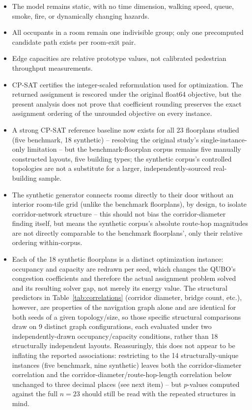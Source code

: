 \documentclass[11pt]{article}
\begin{document}
\begin{itemize}[leftmargin=*]
\item The model remains static, with no time dimension, walking speed, queue, smoke, fire, or dynamically changing hazards.
\item All occupants in a room remain one indivisible group; only one precomputed candidate path exists per room-exit pair.
\item Edge capacities are relative prototype values, not calibrated pedestrian throughput measurements.
\item CP-SAT certifies the integer-scaled reformulation used for optimization. The returned assignment is rescored under the original float64 objective, but the present analysis does not prove that coefficient rounding preserves the exact assignment ordering of the unrounded objective on every instance.
\item A strong CP-SAT reference baseline now exists for all 23 floorplans studied (five benchmark, 18 synthetic) -- resolving the original study's single-instance-only limitation -- but the benchmark-floorplan corpus remains five manually constructed layouts, five building types; the synthetic corpus's controlled topologies are not a substitute for a larger, independently-sourced real-building sample.
\item The synthetic generator connects rooms directly to their door without an interior room-tile grid (unlike the benchmark floorplans), by design, to isolate corridor-network structure -- this should not bias the corridor-diameter finding itself, but means the synthetic corpus's absolute route-hop magnitudes are not directly comparable to the benchmark floorplans', only their relative ordering within-corpus.
\item Each of the 18 synthetic floorplans is a distinct optimization instance: occupancy and capacity are redrawn per seed, which changes the QUBO's congestion coefficients and therefore the actual assignment problem solved and its resulting solver gap, not merely its energy value. The structural predictors in Table~\ref{tab:correlations} (corridor diameter, bridge count, etc.), however, are properties of the navigation graph alone and are identical for both seeds of a given topology/size, so those specific structural comparisons draw on 9 distinct graph configurations, each evaluated under two independently-drawn occupancy/capacity conditions, rather than 18 structurally independent layouts. Reassuringly, this does not appear to be inflating the reported associations: restricting to the 14 structurally-unique instances (five benchmark, nine synthetic) leaves both the corridor-diameter correlation and the corridor-diameter/route-hop-length correlation below unchanged to three decimal places (see next item) -- but $p$-values computed against the full $n=23$ should still be read with the repeated structures in mind.

\end{itemize}
\end{document}
